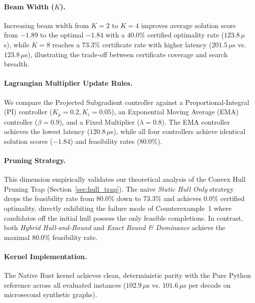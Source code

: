 \documentclass[11pt,a4paper]{article}
\theoremstyle{plain}
\theoremstyle{definition}
\theoremstyle{remark}
\begin{document}


\paragraph{Beam Width ($K$).} Increasing beam width from $K=2$ to $K=4$ improves average solution score from $-1.89$ to the optimal $-1.84$ with a $40.0\%$ certified optimality rate ($123.8\,\mu$s), while $K=8$ reaches a $73.3\%$ certificate rate with higher latency ($201.5\,\mu$s vs. $123.8\,\mu$s), illustrating the trade-off between certificate coverage and search breadth.

\paragraph{Lagrangian Multiplier Update Rules.} We compare the Projected Subgradient controller against a Proportional-Integral (PI) controller ($K_p=0.2, K_i=0.05$), an Exponential Moving Average (EMA) controller ($\beta=0.9$), and a Fixed Multiplier ($\lambda=0.8$). The EMA controller achieves the lowest latency ($120.8\,\mu$s), while all four controllers achieve identical solution scores ($-1.84$) and feasibility rates ($80.0\%$).

\paragraph{Pruning Strategy.} This dimension empirically validates our theoretical analysis of the Convex Hull Pruning Trap (Section~\ref{sec:hull_trap}). The naive \emph{Static Hull Only} strategy drops the feasibility rate from $80.0\%$ down to $73.3\%$ and achieves $0.0\%$ certified optimality, directly exhibiting the failure mode of Counterexample~1 where candidates off the initial hull possess the only feasible completions. In contrast, both \emph{Hybrid Hull-and-Bound} and \emph{Exact Bound \& Dominance} achieve the maximal $80.0\%$ feasibility rate.

\paragraph{Kernel Implementation.} The Native Rust kernel achieves clean, deterministic parity with the Pure Python reference across all evaluated instances ($102.9\,\mu$s vs. $101.6\,\mu$s per decode on microsecond synthetic graphs).
\end{document}
